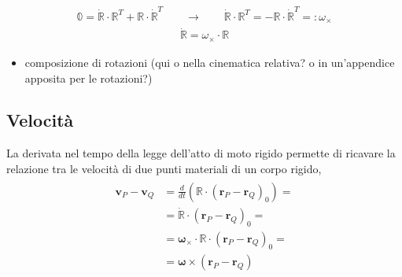 \documentclass[letterpaper,10pt,english]{jupyterBook}
\begin{document}
\begin{equation*}
\begin{split}\mathbb{0} = \dot{\mathbb{R}} \cdot \mathbb{R}^T + {\mathbb{R}} \cdot \dot{\mathbb{R}}^T \qquad \rightarrow \qquad
\dot{\mathbb{R}} \cdot \mathbb{R}^T = - \mathbb{R} \cdot \dot{\mathbb{R}}^T =: \omega_{\times}\end{split}
\end{equation*}\begin{equation*}
\begin{split}\dot{\mathbb{R}} = \omega_{\times} \cdot \mathbb{R}\end{split}
\end{equation*}\begin{itemize}
\item {} 
\sphinxAtStartPar
composizione di rotazioni (qui o nella cinematica relativa? o in un’appendice apposita per le rotazioni?)

\end{itemize}


\subsection{Velocità}
\label{\detokenize{ch/kinematics-rigid:velocita}}
\sphinxAtStartPar
La derivata nel tempo della legge dell’atto di moto rigido permette di ricavare la relazione tra le velocità di due punti materiali di un corpo rigido,
\begin{equation*}
\begin{split}\begin{aligned}
  \mathbf{v}_P - \mathbf{v}_Q & = \frac{d}{dt} \left( \mathbb{R} \cdot (\mathbf{r}_P - \mathbf{r}_Q)_0 \right) = \\
                              & = \dot{\mathbb{R}} \cdot (\mathbf{r}_P - \mathbf{r}_Q)_0 = \\
                              & = \symbf{\omega}_{\times} \cdot \mathbb{R} \cdot (\mathbf{r}_P - \mathbf{r}_Q)_0 = \\
                              & = \symbf{\omega} \times ( \mathbf{r}_P - \mathbf{r}_Q ) 
\end{aligned}\end{split}
\end{equation*}
\end{document}
